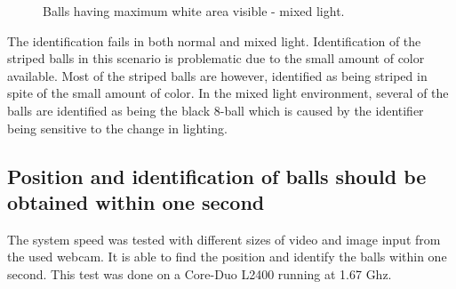 \begin{figure}[htpb]
  \centering
  \quad
  \quad
   \caption{Balls having maximum white area visible - mixed light.}
  \label{fig:maxmixed}
\end{figure}
The identification fails in both normal and mixed light. Identification of the striped balls in this scenario is problematic due to the small amount of color available. Most of the striped balls are however, identified as being striped in spite of the small amount of color. In the mixed light environment, several of the balls are identified as being the black 8-ball which is caused by the identifier being sensitive to the change in lighting.

\subsection{Position and identification of balls should be obtained within one second}
The system speed was tested with different sizes of video and image input from the used webcam. It is able to find the position and identify the balls within one second. This test was done on a Core-Duo L2400 running at 1.67 Ghz. 
